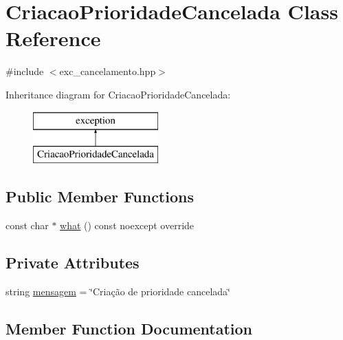 \hypertarget{classCriacaoPrioridadeCancelada}{}\section{Criacao\+Prioridade\+Cancelada Class Reference}
\label{classCriacaoPrioridadeCancelada}


{\ttfamily \#include $<$exc\+\_\+cancelamento.\+hpp$>$}

Inheritance diagram for Criacao\+Prioridade\+Cancelada\+:\begin{figure}[H]
\begin{center}
\leavevmode
\includegraphics[height=2.000000cm]{classCriacaoPrioridadeCancelada}
\end{center}
\end{figure}
\subsection*{Public Member Functions}
\begin{DoxyCompactItemize}
\item 
const char $\ast$ \hyperlink{classCriacaoPrioridadeCancelada_aaa4835bad23542e67d2dedd75c9e7ded}{what} () const noexcept override
\end{DoxyCompactItemize}
\subsection*{Private Attributes}
\begin{DoxyCompactItemize}
\item 
string \hyperlink{classCriacaoPrioridadeCancelada_aec9dedf305887e4227ed1af5cf26b49c}{mensagem} = \char`\"{}Criação de prioridade cancelada\char`\"{}
\end{DoxyCompactItemize}


\subsection{Member Function Documentation}
\mbox{\label{classCriacaoPrioridadeCancelada_aaa4835bad23542e67d2dedd75c9e7ded}} 
